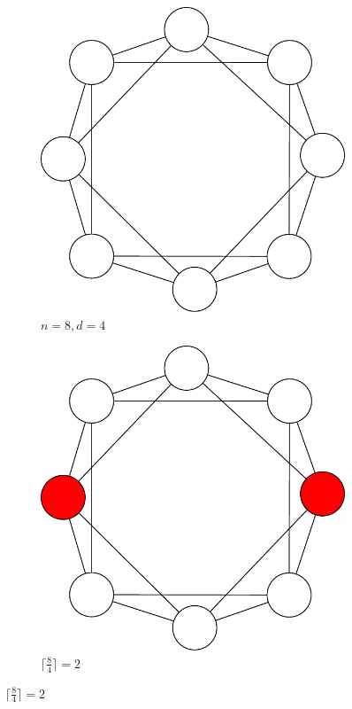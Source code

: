 \begin{figure}[ht]
\centering
\begin{subfigure}[b]{0.4\textwidth}
	\includegraphics[scale=0.6]{images/dRegular.pdf}
	\caption{$n = 8, d = 4$}
\end{subfigure}
\begin{subfigure}[b]{0.4\textwidth}
	\includegraphics[scale=0.6]{images/dRegularSol.pdf}
	\caption{$\lceil\frac{8}{4}\rceil = 2$}
\end{subfigure}
\end{figure}

